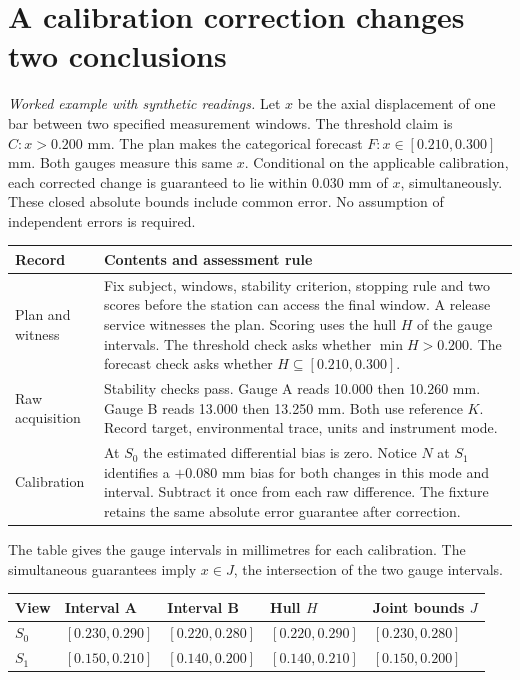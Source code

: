 \documentclass[11pt,a4paper]{article}
\newcommand{\partpage}[1]{\clearpage\section{#1}}
\newcommand{\topic}[1]{\par\smallskip{\sffamily\bfseries\color{ink}#1\par}\nobreak}
\begin{document}
\partpage{A calibration correction changes two conclusions}\label{sec:bar}
\textit{Worked example with synthetic readings.} Let $x$ be the axial displacement of one bar between two specified measurement windows. The threshold claim is $C: x>0.200$ mm. The plan makes the categorical forecast $F: x\in[0.210,0.300]$ mm. Both gauges measure this same $x$. Conditional on the applicable calibration, each corrected change is guaranteed to lie within $0.030$ mm of $x$, simultaneously. These closed absolute bounds include common error. No assumption of independent errors is required.

\small
\begin{tabularx}{\linewidth}{@{}L{.17\linewidth}Y@{}}
\toprule
\textbf{Record} & \textbf{Contents and assessment rule} \\ \midrule
Plan and witness & Fix subject, windows, stability criterion, stopping rule and two scores before the station can access the final window. A release service witnesses the plan. Scoring uses the hull $H$ of the gauge intervals. The threshold check asks whether $\min H>0.200$. The forecast check asks whether $H\subseteq[0.210,0.300]$. \\
Raw acquisition & Stability checks pass. Gauge A reads 10.000 then 10.260 mm. Gauge B reads 13.000 then 13.250 mm. Both use reference $K$. Record target, environmental trace, units and instrument mode. \\
Calibration & At $S_0$ the estimated differential bias is zero. Notice $N$ at $S_1$ identifies a $+0.080$ mm bias for both changes in this mode and interval. Subtract it once from each raw difference. The fixture retains the same absolute error guarantee after correction. \\
\bottomrule
\end{tabularx}
\normalsize

\topic{What the recorded numbers imply}
The table gives the gauge intervals in millimetres for each calibration. The simultaneous guarantees imply $x\in J$, the intersection of the two gauge intervals.

\small
\begin{tabularx}{\linewidth}{@{}lYYYY@{}}
\toprule
\textbf{View} & \textbf{Interval A} & \textbf{Interval B} & \textbf{Hull $H$} & \textbf{Joint bounds $J$} \\ \midrule
$S_0$ & $[0.230,0.290]$ & $[0.220,0.280]$ & $[0.220,0.290]$ & $[0.230,0.280]$ \\
$S_1$ & $[0.150,0.210]$ & $[0.140,0.200]$ & $[0.140,0.210]$ & $[0.150,0.200]$ \\
\bottomrule
\end{tabularx}
\normalsize
\end{document}
